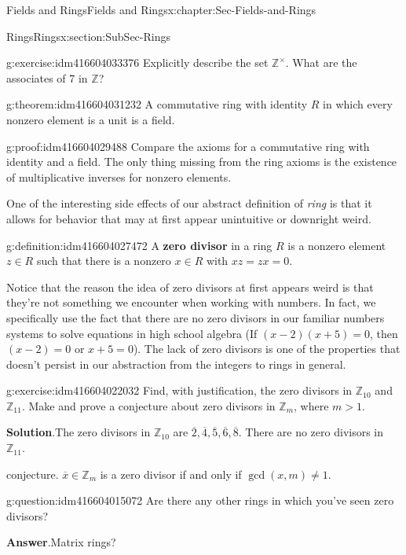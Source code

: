 \documentclass[oneside,10pt,]{book}
\newcommand{\terminology}[1]{\textbf{#1}}
\numberwithin{equation}{section}
\def\Z{{\mathbb Z}}
\begin{document}
\begin{chapterptx}{Fields and Rings}{}{Fields and Rings}{}{}{x:chapter:Sec-Fields-and-Rings}
\begin{sectionptx}{Rings}{}{Rings}{}{}{x:section:SubSec-Rings}
\begin{inlineexercise}{}{g:exercise:idm416604033376}
Explicitly describe the set \(\Z^\times\). What are the associates of 7 in \(\Z\)?%
\end{inlineexercise}
\begin{theorem}{}{}{g:theorem:idm416604031232}%
A commutative ring with identity \(R\) in which every nonzero element is a unit is a field.%
\end{theorem}
\begin{proofptx}{}{g:proof:idm416604029488}
Compare the axioms for a commutative ring with identity and a field. The only thing missing from the ring axioms is the existence of multiplicative inverses for nonzero elements.%
\end{proofptx}
One of the interesting side effects of our abstract definition of \emph{ring} is that it allows for behavior that may at first appear unintuitive or downright weird.%
\begin{definition}{}{g:definition:idm416604027472}%
A \terminology{zero divisor} in a ring \(R\) is a nonzero element \(z\in R\) such that there is a nonzero \(x\in R\) with \(xz = zx = 0\).%
\end{definition}
Notice that the reason the idea of zero divisors at first appears weird is that they're not something we encounter when working with numbers. In fact, we specifically use the fact that there are no zero divisors in our familiar numbers systems to solve equations in high school algebra (If \((x-2)(x+5)=0\), then \((x-2)=0\) or \(x+5=0\)). The lack of zero divisors is one of the properties that doesn't persist in our abstraction from the integers to rings in general.%
\begin{inlineexercise}{}{g:exercise:idm416604022032}%
Find, with justification, the zero divisors in \(\Z_{10}\) and \(\Z_{11}\). Make and prove a conjecture about zero divisors in \(\Z_m\), where \(m > 1\).%
\par\smallskip%
\noindent\textbf{Solution}.\hypertarget{g:solution:idm416604019136}{}\quad{}The zero divisors in \(\Z_{10}\) are \(\overline{2}, \overline{4}, \overline{5}, \overline{6},\overline{8}\). There are no zero divisors in \(\Z_{11}\).%
\par
conjecture. \(\overline{x}\in \Z_m\) is a zero divisor if and only if \(\gcd(x,m) \ne 1\).%
\end{inlineexercise}
\begin{question}{}{g:question:idm416604015072}%
Are there any other rings in which you've seen zero divisors?%
\par\smallskip%
\noindent\textbf{Answer}.\hypertarget{g:answer:idm416604013888}{}\quad{}Matrix rings?%

\end{question}
\end{sectionptx}
\end{chapterptx}
\end{document}
